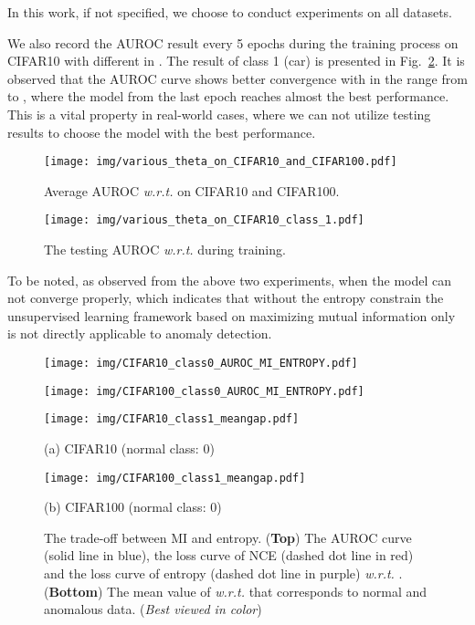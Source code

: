 \documentclass[journal]{IEEEtran}
\theoremstyle{remark}
\begin{document}
In this work, if not specified, we choose  to conduct experiments on all datasets. 

We also record the AUROC result every 5 epochs during the training process on CIFAR10 with different  in . The result of class 1 (car) is presented in Fig.~\ref{img:Entropy_WITH_OR_WITHOUT}. It is observed that the AUROC curve shows better convergence with  in the range from  to , where the model from the last epoch reaches almost the best performance. This is a vital property in real-world cases, where we can not utilize testing results to choose the model with the best performance. 

\begin{figure}[t]
\centering
\texttt{[image: img/various\_theta\_on\_CIFAR10\_and\_CIFAR100.pdf]}
\caption{Average AUROC \textit{w.r.t.}  on CIFAR10 and CIFAR100. }
\label{img:balence}
\end{figure}

\begin{figure}[t]
\centering
\texttt{[image: img/various\_theta\_on\_CIFAR10\_class\_1.pdf]}
\caption{The testing AUROC \textit{w.r.t.}  during training. }
\label{img:Entropy_WITH_OR_WITHOUT}
\end{figure}


To be noted, as observed from the above two experiments, when  the model can not converge properly, which indicates that without the entropy constrain the unsupervised learning framework based on maximizing mutual information only is not directly applicable to anomaly detection.

\begin{figure*}[!ht]
\centering
\begin{minipage}[t]{0.49\textwidth}
\centering
\texttt{[image: img/CIFAR10\_class0\_AUROC\_MI\_ENTROPY.pdf]}
\end{minipage}
\hfill
\begin{minipage}[t]{0.47\textwidth}
\centering
\texttt{[image: img/CIFAR100\_class0\_AUROC\_MI\_ENTROPY.pdf]}
\end{minipage}
\begin{minipage}[t]{0.49\textwidth}
\centering
\texttt{[image: img/CIFAR10\_class1\_meangap.pdf]}
\caption*{(a) CIFAR10 (normal class: 0)}
\end{minipage}
\hfill
\begin{minipage}[t]{0.48\textwidth}
\centering
\texttt{[image: img/CIFAR100\_class1\_meangap.pdf]}
\caption*{(b) CIFAR100 (normal class: 0)}
\end{minipage}
\caption{The trade-off between MI and entropy. (\textbf{Top}) The AUROC curve (solid line in blue), the loss curve of NCE (dashed dot line in red) and the loss curve of entropy (dashed dot line in purple) \textit{w.r.t.} . (\textbf{Bottom}) The mean value of  \textit{w.r.t.}  that corresponds to normal and anomalous data. (\textit{Best viewed in color}) }\label{img:gap}
\end{figure*}
\end{document}
